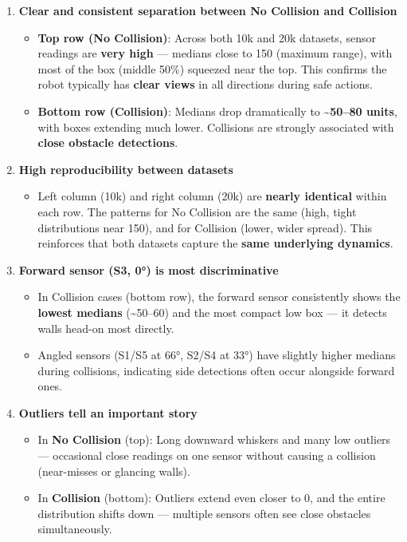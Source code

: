 \begin{enumerate}
\item \textbf{Clear and consistent separation between No Collision and Collision}

\begin{itemize}
\item \textbf{Top row (No Collision)}: Across both 10k and 20k datasets, sensor readings are \textbf{very high} --- medians close to 150 (maximum range), with most of the box (middle 50\%) squeezed near the top. This confirms the robot typically has \textbf{clear views} in all directions during safe actions.
\item \textbf{Bottom row (Collision)}: Medians drop dramatically to \textbf{{\textasciitilde}50--80 units}, with boxes extending much lower. Collisions are strongly associated with \textbf{close obstacle detections}.
\end{itemize}


\item \textbf{High reproducibility between datasets}

\begin{itemize}
\item Left column (10k) and right column (20k) are \textbf{nearly identical} within each row.\newline
The patterns for No Collision are the same (high, tight distributions near 150), and for Collision (lower, wider spread). This reinforces that both datasets capture the \textbf{same underlying dynamics}.
\end{itemize}


\item \textbf{Forward sensor (S3, 0°) is most discriminative}

\begin{itemize}
\item In Collision cases (bottom row), the forward sensor consistently shows the \textbf{lowest medians} ({\textasciitilde}50--60) and the most compact low box --- it detects walls head-on most directly.
\item Angled sensors (S1/S5 at 66°, S2/S4 at 33°) have slightly higher medians during collisions, indicating side detections often occur alongside forward ones.
\end{itemize}


\item \textbf{Outliers tell an important story}

\begin{itemize}
\item In \textbf{No Collision} (top): Long downward whiskers and many low outliers --- occasional close readings on one sensor without causing a collision (near-misses or glancing walls).
\item In \textbf{Collision} (bottom): Outliers extend even closer to 0, and the entire distribution shifts down --- multiple sensors often see close obstacles simultaneously.
\end{itemize}



\end{enumerate}
